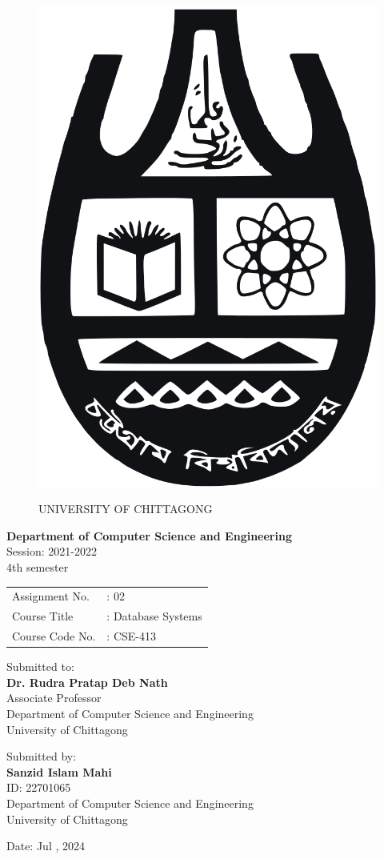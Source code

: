 
\begin{figure}[h]
		\vspace*{-1em}
		\centering
		\includegraphics[width=0.2\linewidth]{university_logo.png}
		\par
		\vspace*{2em}
		{\Large UNIVERSITY OF CHITTAGONG}
\end{figure}
\begin{center}
		\vspace*{3em}
		\textbf{Department of Computer Science and Engineering} \\
		\bigskip
		Session: 2021-2022 \\
		4th semester \\
		\bigskip
		\begin{tabular}{l l}
		  Assignment No. &: 02\\
		  Course Title &: Database Systems \\
		  Course Code No. &: CSE-413 \\
		\end{tabular}
\end{center}

\begin{center}
		\vspace*{3em}
		Submitted to: \\
		\textbf{Dr. Rudra Pratap Deb Nath} \\
		Associate Professor \\
		Department of Computer Science and Engineering \\
		University of Chittagong
\end{center}

\begin{center}
		\vspace*{3em}
		Submitted by: \\
		\textbf{Sanzid Islam Mahi} \\
		ID: 22701065 \\
		Department of Computer Science and Engineering \\
		University of Chittagong
\end{center}




\begin{center}
	\vspace*{3em}
	Date: Jul , 2024
\end{center}